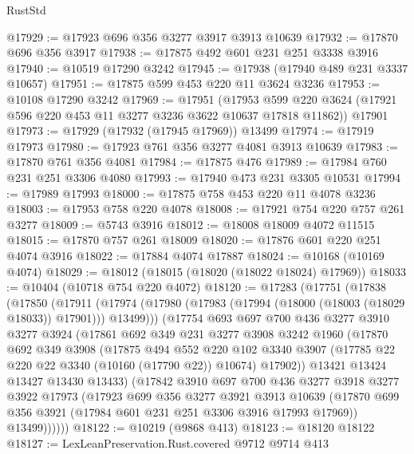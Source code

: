 \begin{lexlean}{RustStd}
\begin{coremodule}
@17929 := @17923 @696 @356 @3277 @3917 @3913 @10639
@17932 := @17870 @696 @356 @3917
@17938 := @17875 @492 @601 @231 @251 @3338 @3916
@17940 := @10519 @17290 @3242
@17945 := @17938 (@17940 @489 @231 @3337 @10657)
@17951 := @17875 @599 @453 @220 @11 @3624 @3236
@17953 := @10108 @17290 @3242
@17969 := @17951
    (@17953 @599 @220 @3624 (@17921 @596 @220 @453 @11 @3277 @3236 @3622 @10637 @17818 @11862))
    @17901
@17973 := @17929 (@17932 (@17945 @17969)) @13499
@17974 := @17919 @17973
@17980 := @17923 @761 @356 @3277 @4081 @3913 @10639
@17983 := @17870 @761 @356 @4081
@17984 := @17875 @476
@17989 := @17984 @760 @231 @251 @3306 @4080
@17993 := @17940 @473 @231 @3305 @10531
@17994 := @17989 @17993
@18000 := @17875 @758 @453 @220 @11 @4078 @3236
@18003 := @17953 @758 @220 @4078
@18008 := @17921 @754 @220 @757 @261 @3277
@18009 := @5743 @3916
@18012 := @18008 @18009 @4072 @11515
@18015 := @17870 @757 @261 @18009
@18020 := @17876 @601 @220 @251 @4074 @3916
@18022 := @17884 @4074 @17887
@18024 := @10168 (@10169 @4074)
@18029 := @18012 (@18015 (@18020 (@18022 @18024) @17969))
@18033 := @10404 (@10718 @754 @220 @4072)
@18120 := @17283
    (@17751
      (@17838
        (@17850
          (@17911
            (@17974 (@17980 (@17983 (@17994 (@18000 (@18003 (@18029 @18033)) @17901))) @13499)))
          (@17754
            @693
            @697
            @700
            @436
            @3277
            @3910
            @3277
            @3924
            (@17861
              @692
              @349
              @231
              @3277
              @3908
              @3242
              @1960
              (@17870
                @692
                @349
                @3908
                (@17875
                  @494
                  @552
                  @220
                  @102
                  @3340
                  @3907
                  (@17785 @22 @220 @22 @3340 (@10160 (@17790 @22)) @10674)
                  @17902))
              @13421
              @13424
              @13427
              @13430
              @13433)
            (@17842
              @3910
              @697
              @700
              @436
              @3277
              @3918
              @3277
              @3922
              @17973
              (@17923
                @699
                @356
                @3277
                @3921
                @3913
                @10639
                (@17870 @699 @356 @3921 (@17984 @601 @231 @251 @3306 @3916 @17993 @17969))
                @13499))))))
@18122 := @10219 (@9868 @413)
@18123 := @18120 @18122
@18127 := LexLeanPreservation.Rust.covered @9712 @9714 @413

\end{coremodule}
\end{lexlean}
